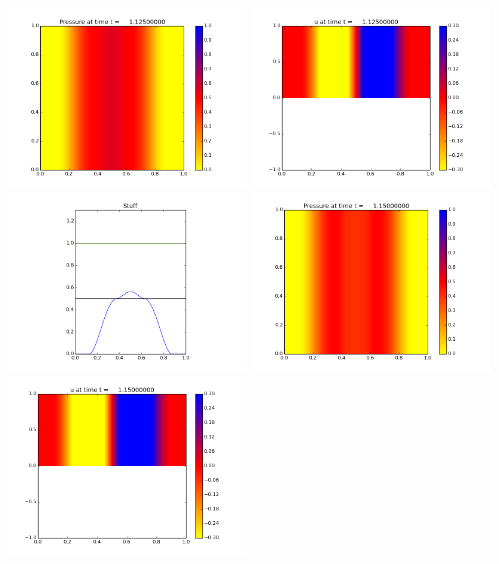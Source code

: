 \documentclass[11pt]{article}
\begin{document}
\vskip 10pt 
\includegraphics[width=0.475\textwidth]{frame0045fig0.png}
\includegraphics[width=0.475\textwidth]{frame0045fig1.png}
\vskip 10pt 
\includegraphics[width=0.475\textwidth]{frame0045fig3.png}
\vskip 10pt 
\includegraphics[width=0.475\textwidth]{frame0046fig0.png}
\includegraphics[width=0.475\textwidth]{frame0046fig1.png}
\end{document}

